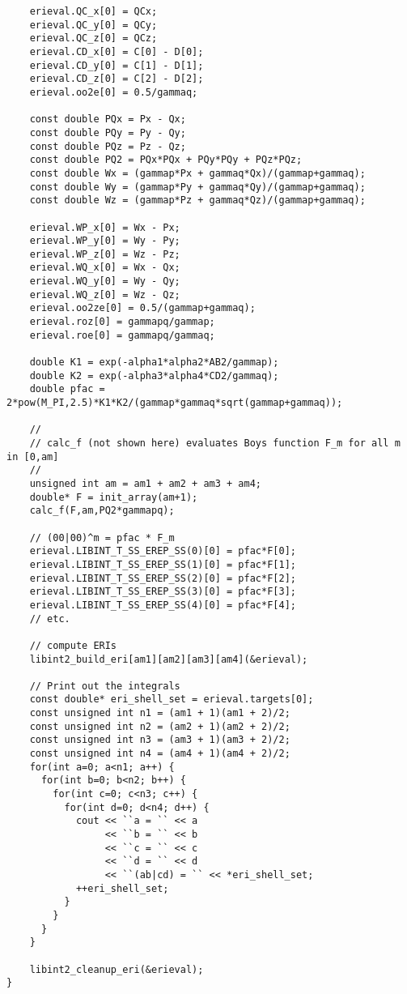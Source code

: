 \documentclass[12pt]{article}
\begin{document}
\begin{footnotesize}
\begin{verbatim}
    erieval.QC_x[0] = QCx;
    erieval.QC_y[0] = QCy;
    erieval.QC_z[0] = QCz;
    erieval.CD_x[0] = C[0] - D[0];
    erieval.CD_y[0] = C[1] - D[1];
    erieval.CD_z[0] = C[2] - D[2];
    erieval.oo2e[0] = 0.5/gammaq;
    
    const double PQx = Px - Qx;
    const double PQy = Py - Qy;
    const double PQz = Pz - Qz;
    const double PQ2 = PQx*PQx + PQy*PQy + PQz*PQz;
    const double Wx = (gammap*Px + gammaq*Qx)/(gammap+gammaq);
    const double Wy = (gammap*Py + gammaq*Qy)/(gammap+gammaq);
    const double Wz = (gammap*Pz + gammaq*Qz)/(gammap+gammaq);
    
    erieval.WP_x[0] = Wx - Px;
    erieval.WP_y[0] = Wy - Py;
    erieval.WP_z[0] = Wz - Pz;
    erieval.WQ_x[0] = Wx - Qx;
    erieval.WQ_y[0] = Wy - Qy;
    erieval.WQ_z[0] = Wz - Qz;
    erieval.oo2ze[0] = 0.5/(gammap+gammaq);
    erieval.roz[0] = gammapq/gammap;
    erieval.roe[0] = gammapq/gammaq;
    
    double K1 = exp(-alpha1*alpha2*AB2/gammap);
    double K2 = exp(-alpha3*alpha4*CD2/gammaq);
    double pfac = 2*pow(M_PI,2.5)*K1*K2/(gammap*gammaq*sqrt(gammap+gammaq));

    //
    // calc_f (not shown here) evaluates Boys function F_m for all m in [0,am]
    //
    unsigned int am = am1 + am2 + am3 + am4;
    double* F = init_array(am+1);
    calc_f(F,am,PQ2*gammapq);

    // (00|00)^m = pfac * F_m
    erieval.LIBINT_T_SS_EREP_SS(0)[0] = pfac*F[0];
    erieval.LIBINT_T_SS_EREP_SS(1)[0] = pfac*F[1];
    erieval.LIBINT_T_SS_EREP_SS(2)[0] = pfac*F[2];
    erieval.LIBINT_T_SS_EREP_SS(3)[0] = pfac*F[3];
    erieval.LIBINT_T_SS_EREP_SS(4)[0] = pfac*F[4];
    // etc.

    // compute ERIs
    libint2_build_eri[am1][am2][am3][am4](&erieval);

    // Print out the integrals
    const double* eri_shell_set = erieval.targets[0];
    const unsigned int n1 = (am1 + 1)(am1 + 2)/2;
    const unsigned int n2 = (am2 + 1)(am2 + 2)/2;
    const unsigned int n3 = (am3 + 1)(am3 + 2)/2;
    const unsigned int n4 = (am4 + 1)(am4 + 2)/2;
    for(int a=0; a<n1; a++) {
      for(int b=0; b<n2; b++) {
        for(int c=0; c<n3; c++) {
          for(int d=0; d<n4; d++) {
            cout << ``a = `` << a
                 << ``b = `` << b
                 << ``c = `` << c
                 << ``d = `` << d
                 << ``(ab|cd) = `` << *eri_shell_set;
            ++eri_shell_set;
          }
        }
      }
    }

    libint2_cleanup_eri(&erieval);
}
\end{verbatim}
\end{footnotesize}
\end{document}
